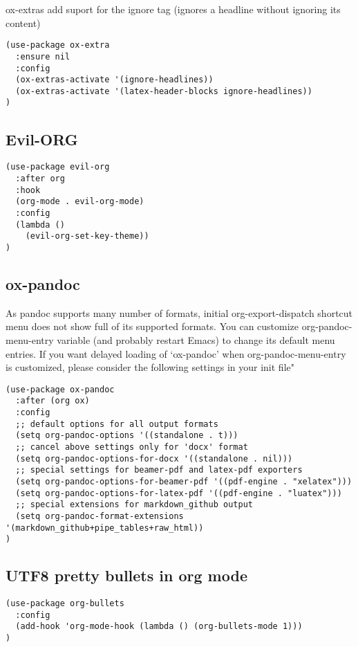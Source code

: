 \documentclass[11pt]{article}
\begin{document}
ox-extras
add suport for the ignore tag (ignores a headline without ignoring its content)

\begin{verbatim}
(use-package ox-extra
  :ensure nil
  :config
  (ox-extras-activate '(ignore-headlines))
  (ox-extras-activate '(latex-header-blocks ignore-headlines))
)
\end{verbatim}

\subsection*{Evil-ORG}
\label{sec:org5a5dc59}

\begin{verbatim}
(use-package evil-org
  :after org
  :hook
  (org-mode . evil-org-mode)
  :config
  (lambda ()
    (evil-org-set-key-theme))
)
\end{verbatim}

\subsection*{ox-pandoc}
\label{sec:orgafbe85e}

\begin{NOTE}
As pandoc supports many number of formats, initial org-export-dispatch
shortcut menu does not show full of its supported formats. You can customize
org-pandoc-menu-entry variable (and probably restart Emacs) to change its
default menu entries.
If you want delayed loading of `ox-pandoc’ when org-pandoc-menu-entry
is customized, please consider the following settings in your init file"
\end{NOTE}

\begin{verbatim}
(use-package ox-pandoc
  :after (org ox)
  :config
  ;; default options for all output formats
  (setq org-pandoc-options '((standalone . t)))
  ;; cancel above settings only for 'docx' format
  (setq org-pandoc-options-for-docx '((standalone . nil)))
  ;; special settings for beamer-pdf and latex-pdf exporters
  (setq org-pandoc-options-for-beamer-pdf '((pdf-engine . "xelatex")))
  (setq org-pandoc-options-for-latex-pdf '((pdf-engine . "luatex")))
  ;; special extensions for markdown_github output
  (setq org-pandoc-format-extensions '(markdown_github+pipe_tables+raw_html))
)
\end{verbatim}

\subsection*{UTF8 pretty bullets in org mode}
\label{sec:org689397b}
\begin{verbatim}
(use-package org-bullets
  :config
  (add-hook 'org-mode-hook (lambda () (org-bullets-mode 1)))
)
\end{verbatim}
\end{document}
